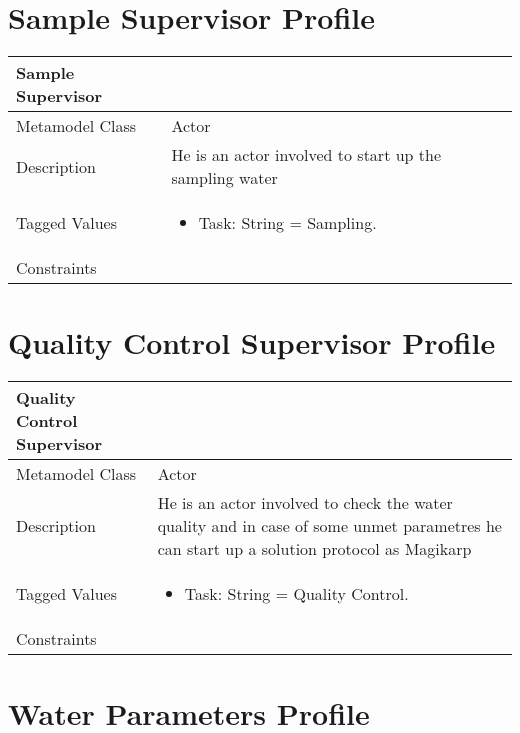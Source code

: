 \section{Sample Supervisor Profile}

\begin{longtable}{|p{4cm}|p{9cm}|}

\hline
\textbf{Sample Supervisor} & \\


\hline
Metamodel Class & Actor\\

\hline
Description & He is an actor involved to start up the sampling water\\

\hline
Tagged Values & 
\begin{itemize}
\item Task: String = Sampling.
\end{itemize}\\

\hline
Constraints &\\

\hline
\end{longtable}


\section{Quality Control Supervisor Profile}

\begin{longtable}{|p{4cm}|p{9cm}|}

\hline
\textbf{Quality Control Supervisor} & \\


\hline
Metamodel Class & Actor\\

\hline
Description & He is an actor involved to check the water quality and in case of some unmet parametres he can start up a solution protocol as Magikarp\\

\hline
Tagged Values & 
\begin{itemize}
\item Task: String = Quality Control.
\end{itemize}\\

\hline
Constraints &\\

\hline
\end{longtable}

\section{Water Parameters Profile}


